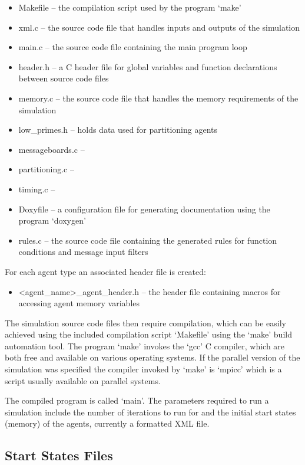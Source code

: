 \begin{itemize}
  \item Makefile -- the compilation script used by the program `make'
  \item xml.c -- the source code file that handles inputs and outputs of the
  simulation
  \item main.c -- the source code file containing the main program loop
  \item header.h -- a C header file for global variables and function
  declarations between source code files
  \item memory.c -- the source code file that handles the memory requirements
  of the simulation
  \item low\_primes.h -- holds data used for partitioning agents
  \item messageboards.c -- 
  \item partitioning.c -- 
  \item timing.c -- 
  \item Doxyfile -- a configuration file for generating documentation using
 the program `doxygen'
  \item rules.c -- the source code file containing the generated rules for
  function conditions and message input filters
\end{itemize}

For each agent type an associated header file is created:

\begin{itemize}
\item <agent\_name>\_agent\_header.h -- the header file containing macros for
  accessing agent memory variables
\end{itemize}

The simulation source code files then require compilation, which can be easily
achieved using the included compilation script `Makefile' using the `make'
build automation tool. The program `make' invokes the `gcc' C compiler, which
are both free and available on various operating systems. If the parallel
version of the simulation was specified the compiler invoked by `make' is
`mpicc' which is a script usually available on parallel systems.

The compiled program is called `main'. The parameters required to run a
simulation include the number of iterations to run for and the initial start
states (memory) of the agents, currently a formatted XML file.

\subsection{Start States Files}

